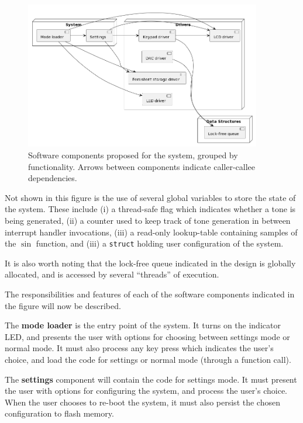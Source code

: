 \documentclass[11pt,a4paper,twocolumn]{scrartcl}
\begin{document}
\begin{figure}
   \centering
   \includegraphics[width=0.92\textwidth]{software_components}
   \caption{Software components proposed for the system, grouped by functionality. Arrows between components indicate caller-callee dependencies.}
   \label{fig:software_components}
\end{figure}

Not shown in this figure is the use of several global variables to store the state of the system. These include 
(i) a thread-safe flag which indicates whether a tone is being generated,
(ii) a counter used to keep track of tone generation in between interrupt handler invocations,
(iii) a read-only lookup-table containing samples of the $\sin$ function, and
(iii) a \verb!struct! holding user configuration of the system.

It is also worth noting that the lock-free queue indicated in the design is globally allocated, and is accessed by several ``threads'' of execution.

The responsibilities and features of each of the software components indicated in the figure will now be described.

The \textbf{mode loader} is the entry point of the system. It turns on the indicator LED, and presents the user with options for choosing between settings mode or normal mode. It must also process any key press which indicates the user's choice, and load the code for settings or normal mode (through a function call).

The \textbf{settings} component will contain the code for settings mode. It must present the user with options for configuring the system, and process the user's choice. When the user chooses to re-boot the system, it must also persist the chosen configuration to flash memory.
\end{document}
